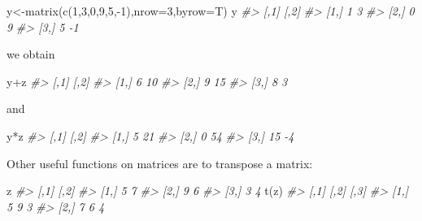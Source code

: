 \documentclass[
]{book}
\newenvironment{Shaded}{\begin{snugshade}}{\end{snugshade}}
\newcommand{\AttributeTok}[1]{\textcolor[rgb]{0.77,0.63,0.00}{#1}}
\newcommand{\CommentTok}[1]{\textcolor[rgb]{0.56,0.35,0.01}{\textit{#1}}}
\newcommand{\DecValTok}[1]{\textcolor[rgb]{0.00,0.00,0.81}{#1}}
\newcommand{\FunctionTok}[1]{\textcolor[rgb]{0.00,0.00,0.00}{#1}}
\newcommand{\NormalTok}[1]{#1}
\newcommand{\OtherTok}[1]{\textcolor[rgb]{0.56,0.35,0.01}{#1}}
\newcommand{\SpecialCharTok}[1]{\textcolor[rgb]{0.00,0.00,0.00}{#1}}
\begin{document}
\begin{Shaded}
\begin{Highlighting}[]
\NormalTok{y}\OtherTok{\textless{}{-}}\FunctionTok{matrix}\NormalTok{(}\FunctionTok{c}\NormalTok{(}\DecValTok{1}\NormalTok{,}\DecValTok{3}\NormalTok{,}\DecValTok{0}\NormalTok{,}\DecValTok{9}\NormalTok{,}\DecValTok{5}\NormalTok{,}\SpecialCharTok{{-}}\DecValTok{1}\NormalTok{),}\AttributeTok{nrow=}\DecValTok{3}\NormalTok{,}\AttributeTok{byrow=}\NormalTok{T)}
\NormalTok{y}
\CommentTok{\#\textgreater{}      [,1] [,2]}
\CommentTok{\#\textgreater{} [1,]    1    3}
\CommentTok{\#\textgreater{} [2,]    0    9}
\CommentTok{\#\textgreater{} [3,]    5   {-}1}
\end{Highlighting}
\end{Shaded}

we obtain

\begin{Shaded}
\begin{Highlighting}[]
\NormalTok{y}\SpecialCharTok{+}\NormalTok{z}
\CommentTok{\#\textgreater{}      [,1] [,2]}
\CommentTok{\#\textgreater{} [1,]    6   10}
\CommentTok{\#\textgreater{} [2,]    9   15}
\CommentTok{\#\textgreater{} [3,]    8    3}
\end{Highlighting}
\end{Shaded}

and

\begin{Shaded}
\begin{Highlighting}[]
\NormalTok{y}\SpecialCharTok{*}\NormalTok{z}
\CommentTok{\#\textgreater{}      [,1] [,2]}
\CommentTok{\#\textgreater{} [1,]    5   21}
\CommentTok{\#\textgreater{} [2,]    0   54}
\CommentTok{\#\textgreater{} [3,]   15   {-}4}
\end{Highlighting}
\end{Shaded}

Other useful functions on matrices are to transpose a matrix:

\begin{Shaded}
\begin{Highlighting}[]
\NormalTok{z}
\CommentTok{\#\textgreater{}      [,1] [,2]}
\CommentTok{\#\textgreater{} [1,]    5    7}
\CommentTok{\#\textgreater{} [2,]    9    6}
\CommentTok{\#\textgreater{} [3,]    3    4}
\FunctionTok{t}\NormalTok{(z)}
\CommentTok{\#\textgreater{}      [,1] [,2] [,3]}
\CommentTok{\#\textgreater{} [1,]    5    9    3}
\CommentTok{\#\textgreater{} [2,]    7    6    4}
\end{Highlighting}
\end{Shaded}
\end{document}

